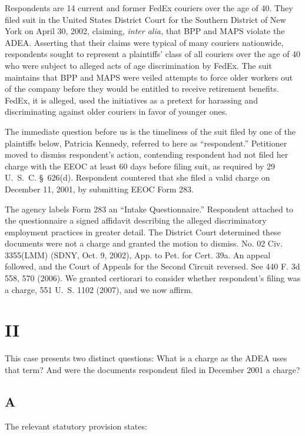   Respondents are 14 current and former FedEx couriers over the age of
40. They filed suit in the United States District Court for the Southern
District of New York on April 30, 2002, claiming, \emph{inter alia,}
that BPP and MAPS violate the ADEA. Asserting that their claims were
typical of many couriers nationwide, respondents sought to represent a
plaintiffs' class of all couriers over the age of 40 who were subject
to alleged acts of age discrimination by FedEx. The suit maintains that
BPP and MAPS were veiled attempts to force older workers out of the
company before they would be entitled to receive retirement benefits.
FedEx, it is alleged, used the initiatives as a pretext for harassing
and discriminating against older couriers in favor of younger ones.

  The immediate question before us is the timeliness of the suit filed
by one of the plaintiffs below, Patricia Kennedy, referred to here as
``respondent.'' Petitioner moved to dismiss respondent's action,
contending respondent had not filed her charge with the EEOC at least
60 days before filing suit, as required by 29 U.~S.~C. \S~626(d).
Respondent countered that she filed a valid charge on December 11, 2001,
by submitting EEOC Form 283.

  The agency labels Form 283 an ``Intake Questionnaire.'' Respondent
attached to the questionnaire a signed affidavit describing the alleged
discriminatory employment practices in greater detail. The District
Court determined these documents were not a charge and granted the
motion to dismiss. No. 02 Civ. 3355(LMM) (SDNY, Oct. 9, 2002), App.
to Pet. for Cert. 39a. An appeal followed, and the Court of Appeals
for the Second Circuit reversed. See 440 F. 3d 558, 570 (2006).
We granted certiorari to consider whether respondent's filing was a
charge, 551 U.~S. 1102 (2007), and we now affirm. \newpage 

\section{II}

  This case presents two distinct questions: What is a charge as the
ADEA uses that term? And were the documents respondent filed in December
2001 a charge?

\subsection{A}

  The relevant statutory provision states:

